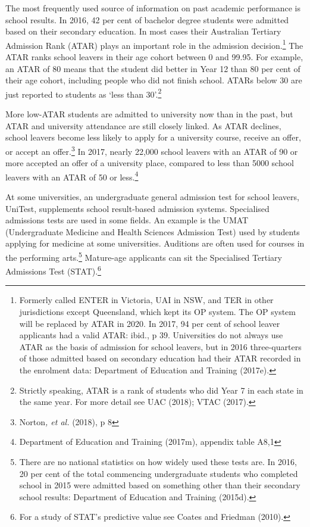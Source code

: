 \documentclass[]{book}
\begin{document}
The most frequently used source of information on past academic performance is school results. In 2016, 42 per cent of bachelor degree students were admitted based on their secondary education. In most cases their Australian Tertiary Admission Rank (ATAR) plays an important role in the admission decision.\footnote{Formerly called ENTER in Victoria, UAI in NSW, and TER in other jurisdictions except Queensland, which kept its OP system. The OP system will be replaced by ATAR in 2020. In 2017, 94 per cent of school leaver applicants had a valid ATAR: ibid., p 39. Universities do not always use ATAR as the basis of admission for school leavers, but in 2016 three-quarters of those admitted based on secondary education had their ATAR recorded in the enrolment data: Department of Education and Training (2017e).} The ATAR ranks school leavers in their age cohort between 0 and 99.95. For example, an ATAR of 80 means that the student did better in Year 12 than 80 per cent of their age cohort, including people who did not finish school. ATARs below 30 are just reported to students as `less than 30'.\footnote{Strictly speaking, ATAR is a rank of students who did Year 7 in each state in the same year. For more detail see UAC (2018); VTAC (2017).}

More low-ATAR students are admitted to university now than in the past, but ATAR and university attendance are still closely linked. As ATAR declines, school leavers become less likely to apply for a university course, receive an offer, or accept an offer.\footnote{Norton\emph{, et al.} (2018), p 8} In 2017, nearly 22,000 school leavers with an ATAR of 90 or more accepted an offer of a university place, compared to less than 5000 school leavers with an ATAR of 50 or less.\footnote{Department of Education and Training (2017m), appendix table A8,1}

At some universities, an undergraduate general admission test for school leavers, UniTest, supplements school result-based admission systems. Specialised admissions tests are used in some fields. An example is the UMAT (Undergraduate Medicine and Health Sciences Admission Test) used by students applying for medicine at some universities. Auditions are often used for courses in the performing arts.\footnote{There are no national statistics on how widely used these tests are. In 2016, 20 per cent of the total commencing undergraduate students who completed school in 2015 were admitted based on something other than their secondary school results: Department of Education and Training (2015d).} Mature-age applicants can sit the Specialised Tertiary Admissions Test (STAT).\footnote{For a study of STAT's predictive value see Coates and Friedman (2010).}
\end{document}
